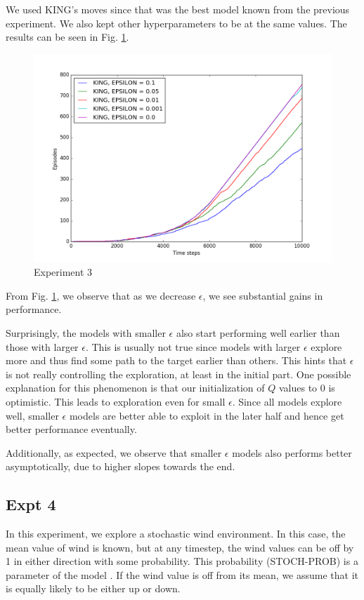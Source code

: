 \documentclass{article}
\begin{document}
    We used KING's moves since that was the best model known from the previous experiment. We also kept other hyperparameters to be at the same values. The results can be seen in Fig. \ref{fig:expt3}.
    
    \begin{figure}[!h]
        \centering
        \includegraphics[width=\textwidth]{expt3}
        \caption{Experiment 3}
        \label{fig:expt3}
    \end{figure}

    From Fig. \ref{fig:expt3}, we observe that as we decrease $\epsilon$, we see substantial gains in performance.
    
    Surprisingly, the models with smaller $\epsilon$ also start performing well earlier than those with larger $\epsilon$. This is usually not true since models with larger $\epsilon$ explore more and thus find some path to the target earlier than others. This hints that $\epsilon$ is not really controlling the exploration, at least in the initial part. One possible explanation for this phenomenon is that our initialization of $Q$ values to $0$ is optimistic. This leads to exploration even for small $\epsilon$. Since all models explore well, smaller $\epsilon$ models are better able to exploit in the later half and hence get better performance eventually.
    
    Additionally, as expected, we observe that smaller $\epsilon$ models also performs better asymptotically, due to higher slopes towards the end.
    
\subsection{Expt 4}
    In this experiment, we explore a stochastic wind environment. In this case, the mean value of wind is known, but at any timestep, the wind values can be off by 1 in either direction with some probability. This probability (STOCH-PROB) is a parameter of the model . If the wind value is off from its mean, we assume that it is equally likely to be either up or down.
    
\end{document}
